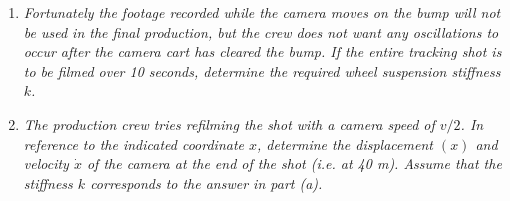 \begin{enumerate}[label=(\alph*)]
    \item \textit{Fortunately the footage recorded while the camera moves on the bump will not be used in the final production, but the crew does not want any oscillations to occur after the camera cart has cleared the bump. If the entire tracking shot is to be filmed over 10 seconds, determine the required wheel suspension stiffness $k$.}
    \item \textit{The production crew tries refilming the shot with a camera speed of $v/2$. In reference to the indicated coordinate $x$, determine the displacement $(x)$ and velocity $\dot{x}$ of the camera at the end of the shot (i.e. at 40 m). Assume that the stiffness $k$ corresponds to the answer in part (a).}
\end{enumerate}
